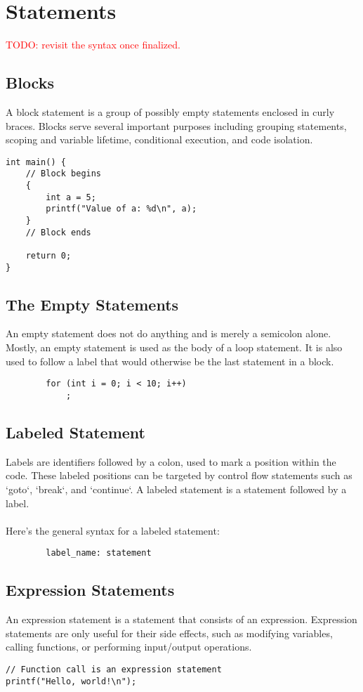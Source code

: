 \documentclass[11pt,A4]{article}
\newcommand{\todo}[1]{\textcolor{red}{#1}}
\begin{document}
    \newpage
    \section{Statements} 
        \todo{TODO: revisit the syntax once finalized.}
        \subsection{Blocks}
        A block statement is a group of possibly empty statements enclosed in curly braces. Blocks serve several important purposes including grouping statements, scoping and variable lifetime, conditional execution, and code isolation.
        \begin{lstlisting}
int main() {
    // Block begins
    {
        int a = 5;
        printf("Value of a: %d\n", a);
    }
    // Block ends

    return 0;
}
        \end{lstlisting}
        
        \subsection{The Empty Statements}
        An empty statement does not do anything and is merely a semicolon alone. Mostly, an empty statement is used as the body of a loop statement. It is also used to follow a label that would otherwise be the last statement in a block. 
        \begin{lstlisting}
        for (int i = 0; i < 10; i++)
            ;
        \end{lstlisting}
        
        \subsection{Labeled Statement}
        Labels are identifiers followed by a colon, used to mark a position within the code. These labeled positions can be targeted by control flow statements such as `goto`, `break`, and `continue`. A labeled statement is a statement followed by a label.\\ \\
        Here's the general syntax for a labeled statement:
        \begin{lstlisting}
        label_name: statement
        \end{lstlisting}
        
        \subsection{Expression Statements}
        An expression statement is a statement that consists of an expression. Expression statements are only useful for their side effects, such as modifying variables, calling functions, or performing input/output operations.
        \begin{lstlisting}
// Function call is an expression statement
printf("Hello, world!\n");
        \end{lstlisting}
\end{document}
